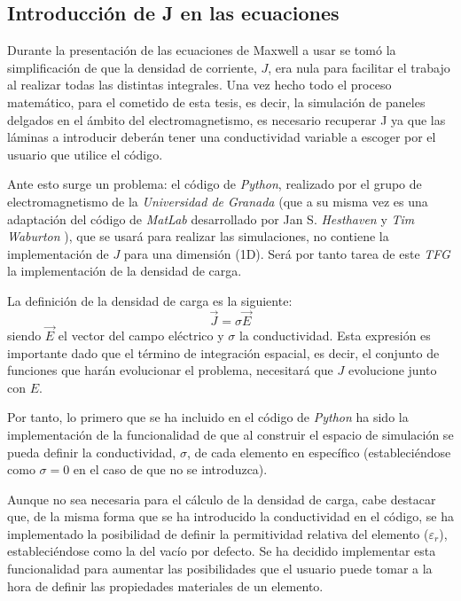 \documentclass[11pt,a4paper,twoside,pdf]{article}
\numberwithin{equation}{section}
\begin{document}
\subsection{Introducción de J en las ecuaciones}
Durante la presentación de las ecuaciones de Maxwell a usar se tomó la simplificación de que la densidad de corriente, $J$, era nula para facilitar el trabajo al realizar todas las distintas integrales. Una vez hecho todo el proceso matemático, para el cometido de esta tesis, es decir, la simulación de paneles delgados en el ámbito del electromagnetismo, es necesario recuperar J ya que las láminas a introducir deberán tener una conductividad variable a escoger por el usuario que utilice el código.

Ante esto surge un problema: el código de \textit{Python}, realizado por el grupo de electromagnetismo de la \textit{Universidad de Granada} \cite{repo} (que a su misma vez es una adaptación del código de \textit{MatLab} desarrollado por Jan S. \textit{Hesthaven} y \textit{Tim Waburton} \cite{Hesthaven}), que se usará para realizar las simulaciones, no contiene la implementación de $J$ para una dimensión (1D). Será por tanto tarea de este \textit{TFG} la implementación de la densidad de carga.

La definición de la densidad de carga es la siguiente:
\begin{equation}
    \vec{J}=\sigma\vec{E}
\end{equation}
siendo $\vec{E}$ el vector del campo eléctrico y $\sigma$ la conductividad. Esta expresión es importante dado que el término de integración espacial, es decir, el conjunto de funciones que harán evolucionar el problema, necesitará que $J$ evolucione junto con $E$.

Por tanto, lo primero que se ha incluido en el código de \textit{Python} ha sido la implementación de la funcionalidad de que al construir el espacio de simulación se pueda definir la conductividad, $\sigma$, de cada elemento en específico (estableciéndose como $\sigma=0$ en el caso de que no se introduzca). 

Aunque no sea necesaria para el cálculo de la densidad de carga, cabe destacar que, de la misma forma que se ha introducido la conductividad en el código, se ha implementado la posibilidad de definir la permitividad relativa del elemento ($\varepsilon_r$), estableciéndose como la del vacío por defecto. Se ha decidido implementar esta funcionalidad para aumentar las posibilidades que el usuario puede tomar a la hora de definir las propiedades materiales de un elemento.
\end{document}
